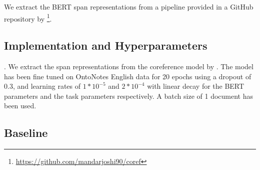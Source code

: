 \documentclass[11pt]{article}
\begin{document}




We extract the BERT span representations from a pipeline provided in a GitHub repository by \textcite{joshi2019coref} \footnote{\url{https://github.com/mandarjoshi90/coref}}. 

\subsection{Implementation and Hyperparameters}. We extract the span representations from the coreference model by \textcite{joshi2019coref}. The model has been fine tuned on OntoNotes English data for 20 epochs using a dropout of 0.3, and learning rates of $1 * 10 ^{-5}$ and $2 * 10 ^{-4} $ with linear decay for the BERT parameters and the task parameters respectively. A batch size of 1 document has been used. 

\subsection{Baseline}
\end{document}
